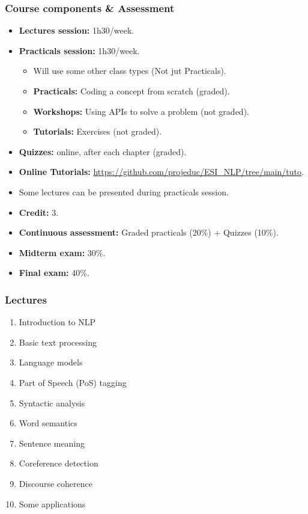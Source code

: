 \documentclass{beamer}
\begin{document}
\begin{frame}
\frametitle{Course components \& Assessment}

\begin{itemize}
	\item \textbf{Lectures session:} 1h30/week.
	\item \textbf{Practicals session:} 1h30/week.
	\begin{itemize}
		\item Will use some other class types (Not jut Practicals).
		\item \textbf{Practicals:} Coding a concept from scratch (graded).
		\item \textbf{Workshops:} Using APIs to solve a problem (not graded).
		\item \textbf{Tutorials:} Exercises (not graded).
	\end{itemize}
	\item \textbf{Quizzes:} online, after each chapter (graded).
	\item \textbf{Online Tutorials:} {\scriptsize\url{https://github.com/projeduc/ESI_NLP/tree/main/tuto}}.
	\item Some lectures can be presented during practicals session.
\end{itemize}

\vfill

\begin{itemize}
	\item \textbf{Credit:} 3.
	\item \textbf{Continuous assessment:} Graded practicals (20\%) + Quizzes (10\%).
	\item \textbf{Midterm exam:} 30\%.
	\item \textbf{Final exam:} 40\%.
\end{itemize}

\end{frame}

\begin{frame}
\frametitle{Lectures}

\begin{enumerate}
	\item Introduction to NLP
	\item Basic text processing
	\item Language models
	\item Part of Speech (PoS) tagging
	\item Syntactic analysis
	\item Word semantics
	\item Sentence meaning
	\item Coreference detection
	\item Discourse coherence
	\item Some applications
\end{enumerate}

\end{frame}
\end{document}

